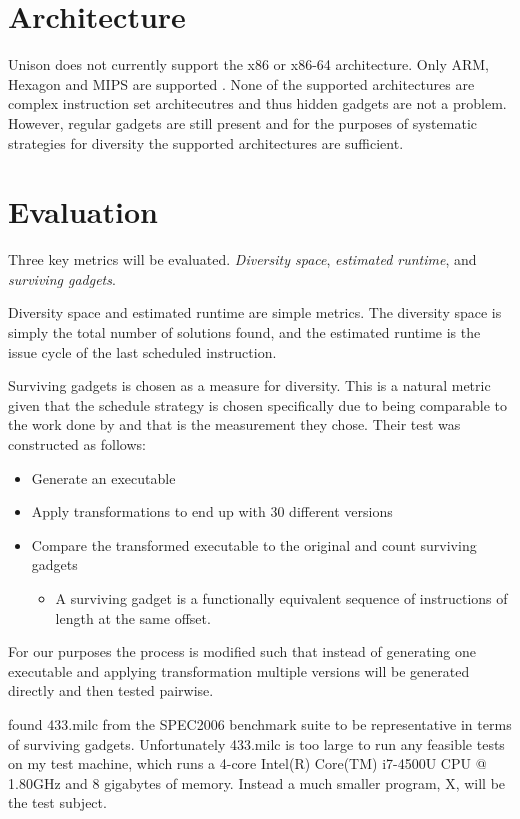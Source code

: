 \section{Architecture}

Unison does not currently support the x86 or x86-64 architecture. Only ARM, Hexagon and MIPS
are supported \cite{unison-src}. None of the supported architectures are complex instruction
set architecutres and thus hidden gadgets are not a problem. However, regular gadgets are
still present and for the purposes of systematic strategies for diversity the supported
architectures are sufficient.

\section{Evaluation}

Three key metrics will be evaluated. \textit{Diversity space}, \textit{estimated runtime},
and \textit{surviving gadgets}.

Diversity space and estimated runtime are simple metrics. The diversity space is simply
the total number of solutions found, and the estimated runtime is the issue cycle of the
last scheduled instruction.

Surviving gadgets is chosen as a measure for diversity. This is a natural metric given 
that the schedule strategy is chosen specifically due to being comparable to the work done
by \textcite{large-scale-automated} and that is the measurement they chose. Their test
was constructed as follows:

\begin{itemize}
	\item Generate an executable
	\item Apply transformations to end up with 30 different versions
	\item Compare the transformed executable to the original and count surviving gadgets
		\begin{itemize}
			\item A surviving gadget is a functionally equivalent sequence of instructions of
			length at the same offset.
		\end{itemize}
\end{itemize}

For our purposes the process is modified such that instead of generating one executable
and applying transformation multiple versions will be generated directly and then tested
pairwise.

\textcite{large-scale-automated} found 433.milc from the SPEC2006 benchmark suite to be
representative in terms of surviving gadgets. Unfortunately 433.milc is too large to run
any feasible tests on my test machine, which runs a 4-core Intel(R) Core(TM) i7-4500U CPU
@ 1.80GHz and 8 gigabytes of memory. Instead a much smaller program, X, will be the test
subject.
